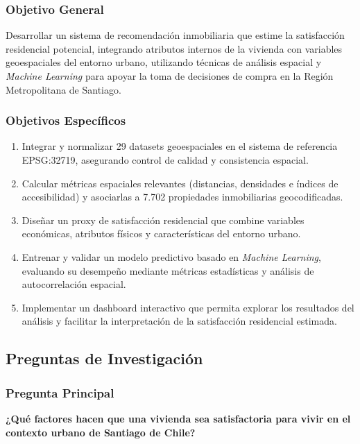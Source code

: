 \documentclass[11pt,letterpaper]{article}
\begin{document}
\subsubsection{Objetivo General}

Desarrollar un sistema de recomendación inmobiliaria que estime la satisfacción residencial potencial, integrando atributos internos de la vivienda con variables geoespaciales del entorno urbano, utilizando técnicas de análisis espacial y \textit{Machine Learning} para apoyar la toma de decisiones de compra en la Región Metropolitana de Santiago.

\subsubsection{Objetivos Específicos}

\begin{enumerate}
    \item Integrar y normalizar 29 datasets geoespaciales en el sistema de referencia EPSG:32719, asegurando control de calidad y consistencia espacial.
    \item Calcular métricas espaciales relevantes (distancias, densidades e índices de accesibilidad) y asociarlas a 7.702 propiedades inmobiliarias geocodificadas.
    \item Diseñar un proxy de satisfacción residencial que combine variables económicas, atributos físicos y características del entorno urbano.
    \item Entrenar y validar un modelo predictivo basado en \textit{Machine Learning}, evaluando su desempeño mediante métricas estadísticas y análisis de autocorrelación espacial.
    \item Implementar un dashboard interactivo que permita explorar los resultados del análisis y facilitar la interpretación de la satisfacción residencial estimada.
\end{enumerate}

\subsection{Preguntas de Investigación}

\subsubsection{Pregunta Principal}
\textbf{¿Qué factores hacen que una vivienda sea satisfactoria para vivir en el contexto urbano de Santiago de Chile?}
\end{document}
